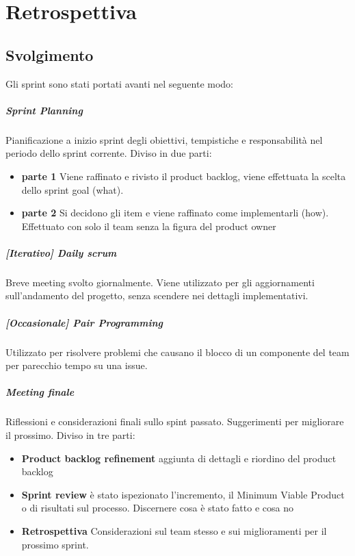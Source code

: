 \chapter{Retrospettiva}

\section{Svolgimento}
Gli sprint sono stati portati avanti nel seguente modo:
    \paragraph{Sprint Planning}
        Pianificazione a inizio sprint degli obiettivi, tempistiche e responsabilità nel periodo dello sprint corrente. Diviso in due parti:
        \begin{itemize}
        \item\textbf{parte 1} 
            Viene raffinato e rivisto il product backlog, viene effettuata la scelta dello sprint goal (what).
        \item\textbf{parte 2}
            Si decidono gli item e viene raffinato come implementarli (how). Effettuato con solo il team senza la figura del product owner
        \end{itemize}
    \paragraph{[Iterativo] Daily scrum} Breve meeting svolto giornalmente. Viene utilizzato per gli aggiornamenti sull'andamento del progetto, senza scendere nei dettagli implementativi.
    \paragraph{[Occasionale] Pair Programming } Utilizzato per risolvere problemi che causano il blocco di un componente del team per parecchio tempo su una issue.
    \paragraph{Meeting finale}
        Riflessioni e considerazioni finali sullo spint passato. Suggerimenti per migliorare il prossimo. Diviso in tre parti: 
        \begin{itemize}
        \item\textbf{Product backlog refinement} aggiunta di dettagli e riordino del product backlog
        \item\textbf{Sprint review} è stato ispezionato l'incremento, il Minimum Viable Product o di risultati sul processo. Discernere cosa è stato fatto e cosa no
        \item\textbf{Retrospettiva} Considerazioni sul team stesso e sui miglioramenti per il prossimo sprint. 
        \end{itemize}

